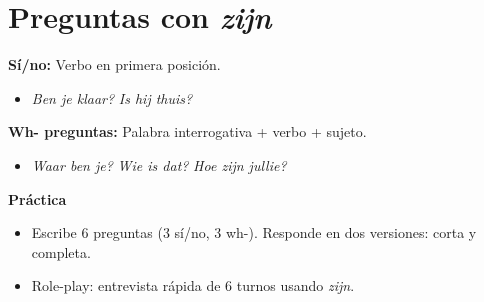 \section{Preguntas con \textit{zijn}}
\textbf{Sí/no:} Verbo en primera posición.
\begin{itemize}[leftmargin=*]
  \item \textit{Ben je klaar?} \textit{Is hij thuis?}
\end{itemize}

\textbf{Wh- preguntas:} Palabra interrogativa + verbo + sujeto.
\begin{itemize}[leftmargin=*]
  \item \textit{Waar ben je?} \textit{Wie is dat?} \textit{Hoe zijn jullie?}
\end{itemize}

\textbf{Práctica}
\begin{itemize}[leftmargin=*]
  \item Escribe 6 preguntas (3 sí/no, 3 wh-). Responde en dos versiones: corta y completa.
  \item Role-play: entrevista rápida de 6 turnos usando \textit{zijn}.
\end{itemize}
